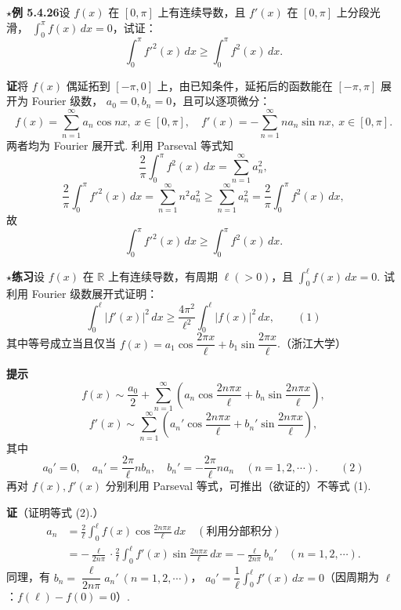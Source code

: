 \documentclass[UTF8, 12pt, fontset=fandol, oneside]{ctexart}
\begin{document}
\noindent\(\star\)\textbf{例 5.4.26}\quad 设 $f(x)$ 在 $[0,\pi]$ 上有连续导数，且 $f'(x)$ 在 $[0,\pi]$ 上分段光滑，
$\displaystyle\int_0^{\pi}f(x)\,dx=0$，试证：
\[
  \int_0^{\pi}f'^2(x)\,dx\ge\int_0^{\pi}f^2(x)\,dx.
\]

\noindent\textbf{证}\quad 将 $f(x)$ 偶延拓到 $[-\pi,0]$ 上，由已知条件，延拓后的函数能在 $[-\pi,\pi]$ 展开为 Fourier 级数，
$a_0=0,b_n=0$，且可以逐项微分：
\[
  f(x)=\sum_{n=1}^{\infty}a_n\cos nx,\ x\in[0,\pi],\quad
  f'(x)=-\sum_{n=1}^{\infty}na_n\sin nx,\ x\in[0,\pi].
\]
两者均为 Fourier 展开式. 利用 Parseval 等式知
\[
  \frac2\pi\int_0^{\pi}f^2(x)\,dx=\sum_{n=1}^{\infty}a_n^2,
\]
\[
  \frac2\pi\int_0^{\pi}f'^2(x)\,dx
  =\sum_{n=1}^{\infty}n^2a_n^2\ge\sum_{n=1}^{\infty}a_n^2
  =\frac2\pi\int_0^{\pi}f^2(x)\,dx,
\]
故
\[
  \int_0^{\pi}f'^2(x)\,dx\ge\int_0^{\pi}f^2(x)\,dx.
\]

\noindent\(\star\)\textbf{练习}\quad 设 $f(x)$ 在 $\mathbb R$ 上有连续导数，有周期 $\ell(>0)$，且
$\displaystyle\int_0^{\ell}f(x)\,dx=0$. 试利用 Fourier 级数展开式证明：
\[
  \int_0^{\ell}|f'(x)|^2\,dx\ge\frac{4\pi^2}{\ell^2}\int_0^{\ell}|f(x)|^2\,dx, \qquad(1)
\]
其中等号成立当且仅当 $f(x)=a_1\cos\dfrac{2\pi x}{\ell}+b_1\sin\dfrac{2\pi x}{\ell}$.（浙江大学）

\noindent\textbf{提示}\quad
\[
  f(x)\sim\frac{a_0}{2}+\sum_{n=1}^{\infty}
  \left(a_n\cos\frac{2n\pi x}{\ell}+b_n\sin\frac{2n\pi x}{\ell}\right),
\]
\[
  f'(x)\sim\sum_{n=1}^{\infty}
  \left(a_n'\cos\frac{2n\pi x}{\ell}+b_n'\sin\frac{2n\pi x}{\ell}\right),
\]
其中
\[
  a_0'=0,\quad a_n'=\frac{2\pi}{\ell}nb_n,\quad b_n'=-\frac{2\pi}{\ell}na_n
  \quad(n=1,2,\cdots). \qquad(2)
\]
再对 $f(x),f'(x)$ 分别利用 Parseval 等式，可推出（欲证的）不等式 (1).

\noindent\textbf{证}\quad （证明等式 (2).）
\[
\begin{aligned}
a_n&=\frac2{\ell}\int_0^{\ell}f(x)\cos\frac{2n\pi x}{\ell}\,dx\quad(\text{利用分部积分})\\
&=-\frac{\ell}{2n\pi}\cdot\frac2{\ell}\int_0^{\ell}f'(x)\sin\frac{2n\pi x}{\ell}\,dx
=-\frac{\ell}{2n\pi}b_n'\quad(n=1,2,\cdots).
\end{aligned}
\]
同理，有 $b_n=\dfrac{\ell}{2n\pi}a_n'\ (n=1,2,\cdots)$，
$a_0'=\dfrac1{\ell}\int_0^{\ell}f'(x)\,dx=0$（因周期为 $\ell$：$f(\ell)-f(0)=0$）.
\end{document}
